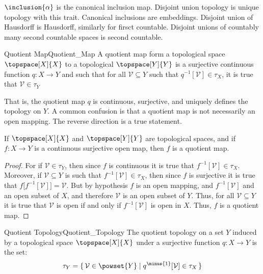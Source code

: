 \documentclass{article}                                                        %
\begin{document}
        $\inclusion{\alpha}$ is the canonical inclusion map. Disjoint union
        topology is unique topology with this trait. Canonical inclusions are
        embeddings. Disjoint union of Hausdorff is Hausdorff, similarly for
        firsct countable. Disjoint unions of countably many second countable
        spaces is second countable.
        \begin{fdefinition}{Quotient Map}{Quotient_Map}
            A quotient map form a topological space $\topspace[X]{X}$ to a
            topological $\topspace[Y]{Y}$ is a surjective continuous function
            $q:X\rightarrow{Y}$ and such that for all
            $\mathcal{V}\subseteq{Y}$ such that
            $q^{\minus{1}}[\mathcal{V}]\in\tau_{X}$, it is true that
            $\mathcal{V}\in\tau_{Y}$
        \end{fdefinition}
        That is, the quotient map $q$ is continuous, surjective, and uniquely
        defines the topology on $Y$. A common confusion is that a quotient map
        is not necessarily an open mapping. The reverse direction is a true
        statement.
        \begin{theorem}
            If $\topspace[X]{X}$ and $\topspace[Y]{Y}$ are topological spaces,
            and if $f:X\rightarrow{Y}$ is a continuous surjective open map,
            then $f$ is a quotient map.
        \end{theorem}
        \begin{proof}
            For if $\mathcal{V}\in\tau_{Y}$, then since $f$ is continuous it is
            true that $f^{\minus{1}}[\mathcal{V}]\in\tau_{X}$. Moreover, if
            $\mathcal{V}\subseteq{Y}$ is such that
            $f^{\minus{1}}[\mathcal{V}]\in\tau_{X}$, then since $f$ is
            surjective it is true that
            $f\big[f^{\minus{1}}[\mathcal{V}]\big]=\mathcal{V}$. But
            by hypothesis $f$ is an open mapping, and
            $f^{\minus{1}}[\mathcal{V}]$ and an open subset of $X$, and
            therefore $\mathcal{V}$ is an open subset of $Y$. Thus, for all
            $\mathcal{V}\subseteq{Y}$ it is true that $\mathcal{V}$ is open if
            and only if $f^{\minus{1}}[\mathcal{V}]$ is open in $X$. Thus,
            $f$ is a quotient map.
        \end{proof}
        \begin{fdefinition}{Quotient Topology}{Quotient_Topology}
            The quotient topology on a set $Y$ induced by a topological space
            $\topspace[X]{X}$ under a surjective function $q:X\rightarrow{Y}$
            is the set:
            \begin{equation*}
                \tau_{Y}=\{\,\mathcal{V}\in\powset{Y}\;|\;
                    q^{\minus{1}}[\mathcal{V}]\in\tau_{X}\,\}
            \end{equation*}
        \end{fdefinition}
\end{document}
